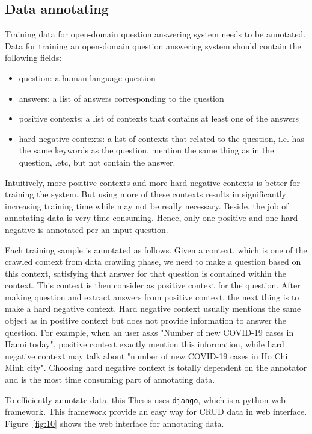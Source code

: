 \documentclass[12pt, sort&compress]{report}
\begin{document}
\subsection{Data annotating}
\label{sec:3.3.2}
Training data for open-domain question answering system needs to be annotated. Data for training an open-domain question answering system should contain the following fields:
\begin{itemize}
	\item {\sf question}: a human-language question
	\item {\sf answers}: a list of answers corresponding to the question
	\item {\sf positive contexts}: a list of contexts that contains at least one of the answers
	\item {\sf hard negative contexts}: a list of contexts that related to the question, i.e. has the same keywords as the question, mention the same thing as in the question, .etc, but not contain the answer.
\end{itemize}
Intuitively, more positive contexts and more hard negative contexts is better for training the system. But using more of these contexts results in significantly increasing training time while may not be really necessary. Beside, the job of annotating data is very time consuming. Hence, only one positive and one hard negative is annotated per an input question. 
\par Each training sample is annotated as follows. Given a context, which is one of the crawled context from data crawling phase, we need to make a question based on this context, satisfying that answer for that question is contained within the context. This context is then consider as positive context for the question. After making question and extract answers from positive context, the next thing is to make a hard negative context. Hard negative context usually mentions the same object as in positive context but does not provide information to answer the question. For example, when an user asks "Number of new COVID-19 cases in Hanoi today", positive context exactly mention this information, while hard negative context may talk about "number of new COVID-19 cases in Ho Chi Minh city". Choosing hard negative context is totally dependent on the annotator and is the most time consuming part of annotating data.
\par To efficiently annotate data, this Thesis uses {\tt django}, which is a python web framework. This framework provide an easy way for CRUD data in web interface. Figure~\ref{fig:10} shows the web interface for annotating data.
\end{document}
